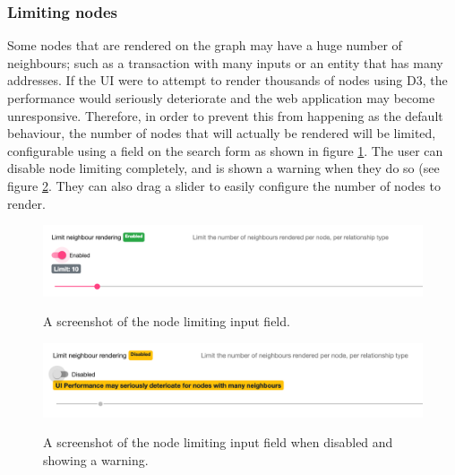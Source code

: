 \subsubsection{Limiting nodes}\label{feature-limit-nodes}
Some nodes that are rendered on the graph may have a huge number of neighbours; such as a transaction with many inputs or an entity that has many addresses. If the UI were to attempt to render thousands of nodes using D3, the performance would seriously deteriorate and the web application may become unresponsive. Therefore, in order to prevent this from happening as the default behaviour, the number of nodes that will actually be rendered will be limited, configurable using a field on the search form as shown in figure \ref{fig:limit-node-filter}. The user can disable node limiting completely, and is shown a warning when they do so (see  figure \ref{fig:limit-node-filter-warning}. They can also drag a slider to easily configure the number of nodes to render. 

\begin{figure}[h!]
  \centering
  \includegraphics[width = 15cm]{./figures/ui-screenshots/limit-nodes-filter}\\[0.5cm] 
  \caption{A screenshot of the node limiting input field.}
  \label{fig:limit-node-filter}
\end{figure}

\begin{figure}[h!]
  \centering
  \includegraphics[width = 15cm]{./figures/ui-screenshots/limit-nodes-filter-warning}\\[0.5cm] 
  \caption{A screenshot of the node limiting input field when disabled and showing a warning.}
  \label{fig:limit-node-filter-warning}
\end{figure}

